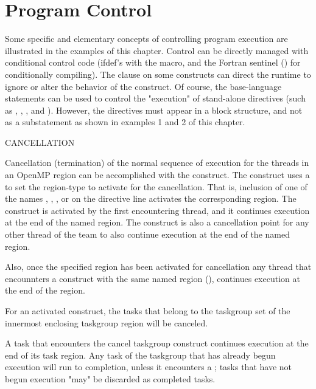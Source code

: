 \pagebreak
\chapter{Program Control}
\label{sec:program_control}

Some specific and elementary concepts of controlling program execution are
illustrated in the examples of this chapter.  Control can be directly
managed with conditional control code (ifdef's with the  
macro, and the Fortran sentinel (\code{!\$}) 
for conditionally compiling). The  clause on some constructs
can direct the runtime to ignore or alter the behavior of the construct.
Of course, the base-language  statements can be used to control the "execution" 
of stand-alone directives (such as , , , 
and  ).
However, the directives must appear in a block structure, and not as a substatement as shown in examples 1 and 2 of this chapter.

\bigskip
CANCELLATION

Cancellation (termination) of the normal sequence of execution for the threads in an OpenMP region can
be  accomplished with the  construct.  The construct uses a
 to set the region-type to activate for the cancellation. 
That is, inclusion  of one of the  names , , 
,  or  on the directive line 
activates the corresponding region.  
The  construct is activated by the first encountering thread,  and it
continues execution at the end of the named region.
The  construct is also a cancellation point for any other thread of the team 
to also continue execution at the end of the named region.  

Also, once the specified region has been activated for cancellation any thread that encounnters 
a  construct with the same named region (),
continues execution at the end of the region.

For an activated  construct, the tasks that
belong to the taskgroup set of the innermost enclosing taskgroup region will be canceled. 

A task that encounters the cancel taskgroup construct continues execution at the end of its
task region. Any task of the taskgroup that has already begun execution will run to completion,
unless it encounters a ; tasks that have not begun execution "may" be
discarded as completed tasks.

